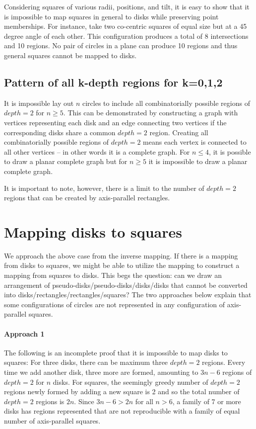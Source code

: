 \documentclass{NSF}
\begin{document}
Considering squares of various radii, positions, and tilt, it is easy to show that it is impossible to map squares in general to disks while preserving point memberships. For instance, take two co-centric squares of equal size but at a 45 degree angle of each other. This configuration produces a total of 8 intersections and 10 regions. No pair of circles in a plane can produce 10 regions and thus general squares cannot be mapped to disks.

\subsection{Pattern of all k-depth regions for k=0,1,2 }
It is impossible lay out $n$ circles to include all combinatorially possible regions of $depth=2$ for $n \geq 5$. This can be demonstrated by constructing a graph with vertices representing each disk and an edge connecting two vertices if the corresponding disks share a common $depth=2$ region. Creating all combinatorially possible regions of $depth=2$ means each vertex is connected to all other vertices -- in other words it is a complete graph. For $n \leq 4$, it is possible to draw a planar complete graph but for $n \geq 5$ it is impossible to draw a planar complete graph.

It is important to note, however, there is  a limit to the number of $depth=2$ regions that can be created by axis-parallel rectangles. 

\section{Mapping disks to squares}
We approach the above case from the inverse mapping. If there is a mapping from disks to squares, we might be able to utilize the mapping to construct a mapping from squares to disks. This begs the question: can we draw an arrangement of pseudo-disks/pseudo-disks/disks/disks that cannot be converted into disks/rectangles/rectangles/squares? The two approaches below explain that some configurations of circles are not represented in any configuration of axis-parallel squares.

\paragraph{Approach 1} The following is an incomplete proof that it is impossible to map disks to squares:
For three disks, there can be maximum three $depth=2$ regions. Every time we add another disk, three more are formed, amounting to $3n-6$ regions of $depth=2$   for $n$ disks. 
For squares, the seemingly greedy number of $depth=2$  regions newly formed by adding a new square is 2 and so the total number of $depth=2$ regions is $2n$.
Since $3n-6 > 2n$ for all $n > 6$, a family of 7 or more disks has regions represented that are not reproducible with a family of equal number of axis-parallel squares.
\end{document}
